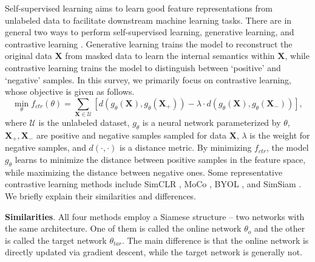 \documentclass[11pt]{article}
\begin{document}
Self-supervised learning aims to learn good feature representations from unlabeled data to facilitate downstream machine learning tasks. There are in general two ways to perform self-supervised learning, generative learning, and contrastive learning \cite{liu2021self}. Generative learning trains the model to reconstruct the original data $\mathbf{X}$ from masked data to learn the internal semantics within $\mathbf{X}$, while contrastive learning trains the model to distinguish between `positive' and `negative' samples. In this survey, we primarily focus on contrastive learning, whose objective is given as follows. 
\begin{equation}
    \min_\theta f_{ctr}(\theta) = \sum_{\mathbf{X}\in\mathcal{U}}\left[d\left(g_\theta(\mathbf{X}), g_\theta(\mathbf{X}_+)\right) - \lambda\cdot d\left(g_\theta(\mathbf{X}), g_\theta(\mathbf{X}_{-})\right)\right],
    \label{eqn:self}
\end{equation}
where $\mathcal{U}$ is the unlabeled dataset, $g_\theta$ is a neural network parameterized by $\theta$, $\mathbf{X}_+, \mathbf{X}_-$ are positive and negative samples sampled for data $\mathbf{X}$, $\lambda$ is the weight for negative samples, and $d(\cdot, \cdot)$ is a distance metric. By minimizing $f_{ctr}$, the model $g_\theta$ learns to minimize the distance between positive samples in the feature space, while maximizing the distance between negative ones. Some representative contrastive learning methods include SimCLR \cite{chen2020simple}, MoCo \cite{he2020momentum}, BYOL \cite{grill2020bootstrap}, and SimSiam \cite{chen2021exploring}. We briefly explain their similarities and differences. 

\textbf{Similarities}. All four methods employ a Siamese structure -- two networks with the same architecture. One of them is called the online network $\theta_{o}$ and the other is called the target network $\theta_{tar}$. The main difference is that the online network is directly updated via gradient descent, while the target network is generally not. 
\end{document}
